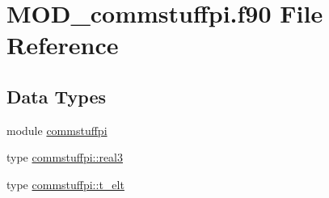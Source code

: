 \hypertarget{MOD__commstuffpi_8f90}{\section{M\-O\-D\-\_\-commstuffpi.\-f90 File Reference}
\label{MOD__commstuffpi_8f90}
}
\subsection*{Data Types}
\begin{DoxyCompactItemize}
\item 
module \hyperlink{classcommstuffpi}{commstuffpi}
\item 
type \hyperlink{structcommstuffpi_1_1real3}{commstuffpi\-::real3}
\item 
type \hyperlink{structcommstuffpi_1_1t__elt}{commstuffpi\-::t\-\_\-elt}
\end{DoxyCompactItemize}
